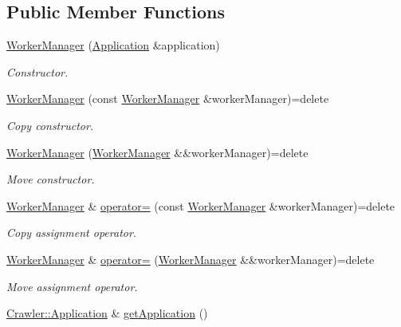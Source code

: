 \subsection*{Public Member Functions}
\begin{DoxyCompactItemize}
\item 
\hyperlink{class_crawler_1_1_worker_manager_af66aa7a09696dc2e3e6c509960152abd}{Worker\+Manager} (\hyperlink{class_crawler_1_1_application}{Application} \&application)
\begin{DoxyCompactList}\small\item\em Constructor. \end{DoxyCompactList}\item 
\hyperlink{class_crawler_1_1_worker_manager_a1ed9da795171ebeb1aabd1506a83632f}{Worker\+Manager} (const \hyperlink{class_crawler_1_1_worker_manager}{Worker\+Manager} \&worker\+Manager)=delete
\begin{DoxyCompactList}\small\item\em Copy constructor. \end{DoxyCompactList}\item 
\hyperlink{class_crawler_1_1_worker_manager_adf7cd8642f26220330375a7da3d66134}{Worker\+Manager} (\hyperlink{class_crawler_1_1_worker_manager}{Worker\+Manager} \&\&worker\+Manager)=delete
\begin{DoxyCompactList}\small\item\em Move constructor. \end{DoxyCompactList}\item 
\hyperlink{class_crawler_1_1_worker_manager}{Worker\+Manager} \& \hyperlink{class_crawler_1_1_worker_manager_a1f2cfe40346b4876bc6699c78a475a96}{operator=} (const \hyperlink{class_crawler_1_1_worker_manager}{Worker\+Manager} \&worker\+Manager)=delete
\begin{DoxyCompactList}\small\item\em Copy assignment operator. \end{DoxyCompactList}\item 
\hyperlink{class_crawler_1_1_worker_manager}{Worker\+Manager} \& \hyperlink{class_crawler_1_1_worker_manager_aa16be296ec92e09be514c7f0b122f0ee}{operator=} (\hyperlink{class_crawler_1_1_worker_manager}{Worker\+Manager} \&\&worker\+Manager)=delete
\begin{DoxyCompactList}\small\item\em Move assignment operator. \end{DoxyCompactList}\item 
\hyperlink{class_crawler_1_1_application}{Crawler\+::\+Application} \& \hyperlink{class_crawler_1_1_worker_manager_a78b7d9c3e7fb1eb3c8d568e8048273de}{get\+Application} ()

\end{DoxyCompactItemize}
